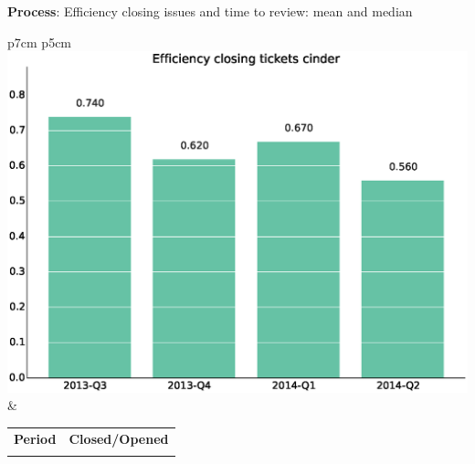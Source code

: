 \documentclass[a4wide,11pt]{report}
\begin{document}
\textbf{Process}: Efficiency closing issues and time to review: mean and median

\begin{tabular}{p{7cm} p{5cm}}
    \vspace{0pt} 
    \includegraphics[scale=.35]{figs/bmicinder.eps}
    & 
    \vspace{0pt}
    \begin{tabular}{l|l}%
    \bfseries Period & \bfseries Closed/Opened %
    \csvreader[head to column names]{data/bmicinder.csv}{}%
    {\\ & \bmi}
    \end{tabular}
\end{tabular}
\end{document}
